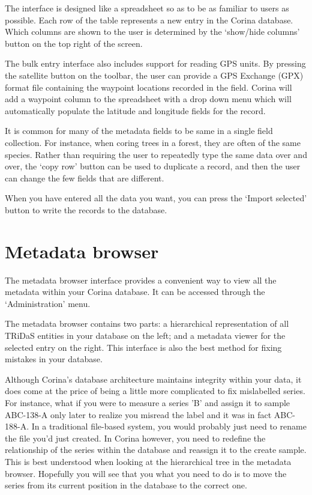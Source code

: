 The interface is designed like a spreadsheet so as to be as familiar to users as possible.  Each row of the table represents a new entry in the Corina database.  Which columns are shown to the user is determined by the `show/hide columns' button on the top right of the screen.  

The bulk entry interface also includes support for reading GPS units.  By pressing the satellite button on the toolbar, the user can provide a GPS Exchange (GPX) format file containing the waypoint locations recorded in the field.   Corina will add a waypoint column to the spreadsheet with a drop down menu which will automatically populate the latitude and longitude fields for the record. 

It is common for many of the metadata fields to be same in a single field collection.  For instance, when coring trees in a forest, they are often of the same species.  Rather than requiring the user to repeatedly type the same data over and over, the `copy row' button can be used to duplicate a record, and then the user can change the few fields that are different.

When you have entered all the data you want, you can press the `Import selected' button to write the records to the database.  

\section{Metadata browser}
The metadata browser interface provides a convenient way to view all the metadata within your Corina database.  It can be accessed through the `Administration' menu.

The metadata browser contains two parts: a hierarchical representation of all TRiDaS entities in your database on the left; and a metadata viewer for the selected entry on the right.  This interface is also the best method for fixing mistakes in your database.  

Although Corina's database architecture maintains integrity within your data, it does come at the price of being a little more complicated to fix mislabelled series.  For instance, what if you were to measure a series 'B' and assign it to sample ABC-138-A only later to realize you misread the label and it was in fact ABC-188-A.  In a traditional file-based system, you would probably just need to rename the file you'd just created.  In Corina however, you need to redefine the relationship of the series within the database and reassign it to the create sample.  This is best understood when looking at the hierarchical tree in the metadata browser.  Hopefully you will see that you what you need to do is to move the series from its current position in the database to the correct one.  

